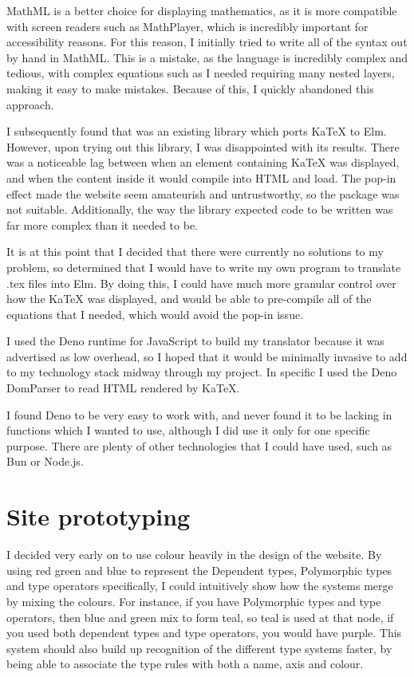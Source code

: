 \documentclass{l4proj}
\begin{document}
MathML is a better choice for displaying mathematics, as it is more compatible with screen readers such as MathPlayer, which is incredibly important for accessibility reasons.  For this reason, I initially tried to write all of the syntax out by hand in MathML.  This is a mistake, as the language is incredibly complex and tedious, with complex equations such as I needed requiring many nested layers, making it easy to make mistakes.  Because of this, I quickly abandoned this approach.

I subsequently found that was an existing library which ports KaTeX to Elm.  However, upon trying out this library, I was disappointed with its results.  There was a noticeable lag between when an element containing KaTeX was displayed, and when the content inside it would compile into HTML and load.  The pop-in effect made the website seem amateurish and untrustworthy, so the package was not suitable.  Additionally, the way the library expected code to be written was far more complex than it needed to be.

It is at this point that I decided that there were currently no solutions to my problem, so determined that I would have to write my own program to translate .tex files into Elm.  By doing this, I could have much more granular control over how the KaTeX was displayed, and would be able to pre-compile all of the equations that I needed, which would avoid the pop-in issue.

I used the Deno runtime for JavaScript to build my translator because it was advertised as low overhead, so I hoped that it would be minimally invasive to add to my technology stack midway through my project.  In specific I used the Deno DomParser to read HTML rendered by KaTeX. 

I found Deno to be very easy to work with, and never found it to be lacking in functions which I wanted to use, although I did use it only for one specific purpose.  There are plenty of other technologies that I could have used, such as Bun or Node.js.

\section{Site prototyping}

I decided very early on to use colour heavily in the design of the website.  By using red green and blue to represent the Dependent types, Polymorphic types and type operators specifically, I could intuitively show how the systems merge by mixing the colours.  For instance, if you have Polymorphic types and type operators, then blue and green mix to form teal, so teal is used at that node, if you used both dependent types and type operators, you would have purple.  This system should also build up recognition of the different type systems faster, by being able to associate the type rules with both a name, axis and colour.
\end{document}
